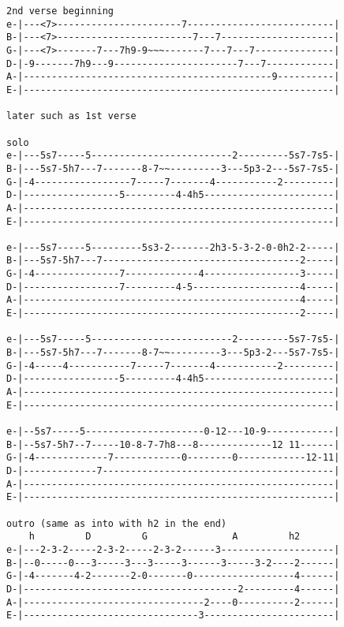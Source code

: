 \begin{verbatim}
2nd verse beginning
e-|---<7>----------------------7--------------------------|
B-|---<7>------------------------7---7--------------------|
G-|---<7>-------7---7h9-9~~~-------7---7---7--------------|
D-|-9-------7h9---9----------------------7---7------------|
A-|--------------------------------------------9----------|
E-|-------------------------------------------------------|

later such as 1st verse

solo
e-|---5s7-----5-------------------------2---------5s7-7s5-|
B-|---5s7-5h7---7-------8-7~~---------3---5p3-2---5s7-7s5-|
G-|-4-----------------7-----7-------4-----------2---------|
D-|-----------------5---------4-4h5-----------------------|
A-|-------------------------------------------------------|
E-|-------------------------------------------------------|

e-|---5s7-----5---------5s3-2-------2h3-5-3-2-0-0h2-2-----|
B-|---5s7-5h7---7-----------------------------------2-----|
G-|-4---------------7-------------4-----------------3-----|
D-|-----------------7---------4-5-------------------4-----|
A-|-------------------------------------------------4-----|
E-|-------------------------------------------------2-----|

e-|---5s7-----5-------------------------2---------5s7-7s5-|
B-|---5s7-5h7---7-------8-7~~---------3---5p3-2---5s7-7s5-|
G-|-4-----4-----------7-----7-------4-----------2---------|
D-|-----------------5---------4-4h5-----------------------|
A-|-------------------------------------------------------|
E-|-------------------------------------------------------|

e-|--5s7-----5---------------------0-12---10-9------------|
B-|--5s7-5h7--7-----10-8-7-7h8---8-------------12 11------|
G-|-4-------------7------------0--------0------------12-11|
D-|-------------7-----------------------------------------|
A-|-------------------------------------------------------|
E-|-------------------------------------------------------|

outro (same as into with h2 in the end)
    h         D         G               A         h2 
e-|---2-3-2-----2-3-2-----2-3-2------3--------------------|
B-|--0-----0---3-----3---3-----3------3-----3-2----2------|
G-|-4-------4-2-------2-0-------0------------------4------|
D-|--------------------------------------2---------4------|
A-|--------------------------------2----0----------2------|
E-|-------------------------------3-----------------------|

\end{verbatim}
\newpage


